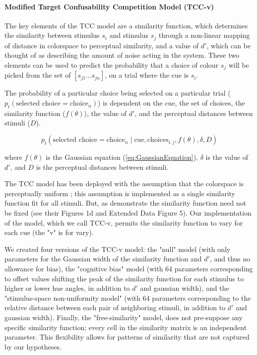 \documentclass[9pt,biorxiv,lineno,onehalfspacing]{lapreprint}
\begin{document}
\begin{refsection}
\paragraph{Modified Target Confusability Competition Model (TCC-v)}\label{para:TCC}

The key elements of the TCC model are a similarity function, which determines the similarity between stimulus $s_i$ and stimulus $s_j$ through a non-linear mapping of distance in colorspace to perceptual similarity, and a value of $d'$, which can be thought of as describing the amount of noise acting in the system. 
These two elements can be used to predict the probability that a choice of colour $s_j$ will be picked from the set of $\left[s_{j1}...s_{jn}\right]$, on a trial where the cue is $s_i$. 

The probability of a particular choice being selected on a particular trial ($p_t(\text{selected choice} = \text{choice}_n)$) is dependent on the cue, the set of choices, the similarity function ($f(\theta)$), the value of $d'$, and the perceptual distances between stimuli ($D$).

\begin{equation} \label{eq:pt}
    p_t\left(\text{selected choice} = \text{choice}_n \mid \text{cue},\text{choices}_{i:j}, f(\theta), \delta, D\right)
\end{equation}

where $f(\theta)$ is the Gaussian equation (\autoref{eq:GaussianEquation}), $\delta$ is the value of $d'$, and $D$ is the perceptual distances between stimuli.

The TCC model has been deployed with the assumption that the colorspace is perceptually uniform \citep{schurgin_psychophysical_2020}; this assumption is implemented as a single similarity function fit for all stimuli. 
But, as \citet{schurgin_psychophysical_2020} demonstrate the similarity function need not be fixed (see their Figures 1d and Extended Data Figure 5). 
Our implementation of the model, which we call TCC-v, permits the similarity function to vary for each cue (the "v" is for vary). 

We created four versions of the TCC-v model: the "null" model (with only parameters for the Gaussian width of the similarity function and $d'$, and thus no allowance for bias), the "cognitive bias" model (with 64 parameters corresponding to offset values shifting the peak of the similarity function for each stimulus to higher or lower hue angles, in addition to $d'$ and gaussian width), and the "stimulus-space non-uniformity model" (with 64 parameters corresponding to the relative distance between each pair of neighboring stimuli, in addition to $d'$ and gaussian width). 
Finally, the "free-similarity" model, does not pre-suppose any specific similarity function; every cell in the similarity matrix is an independent parameter. 
This flexibility allows for patterns of similarity that are not captured by our hypotheses. 


\end{refsection}
\end{document}
